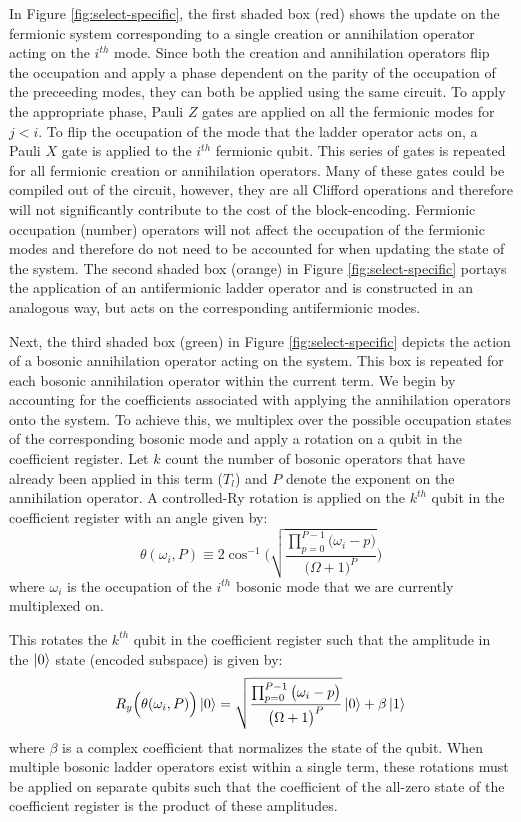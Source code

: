 In Figure \ref{fig:select-specific}, the first shaded box (red) shows the update on the fermionic system corresponding to a single creation or annihilation operator acting on the $i^{th}$ mode.
Since both the creation and annihilation operators flip the occupation and apply a phase dependent on the parity of the occupation of the preceeding modes, they can both be applied using the same circuit.
To apply the appropriate phase, Pauli $Z$ gates are applied on all the fermionic modes for $j < i$.
To flip the occupation of the mode that the ladder operator acts on, a Pauli $X$ gate is applied to the $i^{th}$ fermionic qubit.
This series of gates is repeated for all fermionic creation or annihilation operators.
Many of these gates could be compiled out of the circuit, however, they are all Clifford operations and therefore will not significantly contribute to the cost of the block-encoding.
Fermionic occupation (number) operators will not affect the occupation of the fermionic modes and therefore do not need to be accounted for when updating the state of the system. 
The second shaded box (orange) in Figure \ref{fig:select-specific} portays the application of an antifermionic ladder operator and is constructed in an analogous way, but acts on the corresponding antifermionic modes.

Next, the third shaded box (green) in Figure \ref{fig:select-specific} depicts the action of a bosonic annihilation operator acting on the system.
This box is repeated for each bosonic annihilation operator within the current term.
We begin by accounting for the coefficients associated with applying the annihilation operators onto the system.
To achieve this, we multiplex over the possible occupation states of the corresponding bosonic mode and apply a rotation on a qubit in the coefficient register.
Let $k$ count the number of bosonic operators that have already been applied in this term ($T_l$) and $P$ denote the exponent on the annihilation operator.
A controlled-Ry rotation is applied on the $k^{th}$ qubit in the coefficient register with an angle given by:
\begin{equation}
    \theta(\omega_i, P) \equiv 2 \cos^{-1}{\Big(\sqrt{\frac{\prod_{p=0}^{P-1} \big( \omega_i - p \big)}{\big(\Omega + 1\big)^P}}\Big)}
\end{equation}
where $\omega_i$ is the occupation of the $i^{th}$ bosonic mode that we are currently multiplexed on.

This rotates the $k^{th}$ qubit in the coefficient register such that the amplitude in the $\ket{0}$ state (encoded subspace) is given by:
\begin{equation}
    R_y\Big(\theta(\omega_i, P)\Big) \ket{0} = \sqrt{\frac{\prod_{p=0}^{P-1} \big( \omega_i - p \big)}{\big(\Omega + 1\big)^P}} \ket{0} + \beta \ket{1}
\end{equation}
where $\beta$ is a complex coefficient that normalizes the state of the qubit.
When multiple bosonic ladder operators exist within a single term, these rotations must be applied on separate qubits such that the coefficient of the all-zero state of the coefficient register is the product of these amplitudes. 

